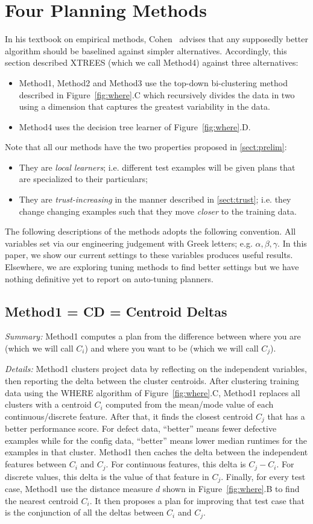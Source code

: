 \documentclass{sig-alternate}
\newcommand{\bi}{\begin{itemize}}
\newcommand{\ei}{\end{itemize}}
\newcommand{\tion}[1]{\textsection\ref{sect:#1}}
\newcommand{\fig}[1]{Figure~\ref{fig:#1}}
\begin{document}
\section{Four Planning Methods}
In his textbook on empirical methods, Cohen~\cite{cohen95} advises that any supposedly better
algorithm should be baselined against simpler alternatives. Accordingly,
this section described XTREES (which we call Method4) against three  
alternatives: 
  \bi
  \item  
  Method1, Method2 and Method3 use the   top-down
	bi-clustering method described in \fig{where}.C  which recursively divides the
	data in two  using a dimension that captures the greatest variability in the data. 
	\item
 Method4 uses the decision tree learner of \fig{where}.D. 
  \ei
  Note that all our methods have the two properties proposed in \tion{prelim}:
  \bi
  \item They are {\em local learners}; i.e. different test examples
  will be given plans that are specialized  to their particulars;
  \item They  are {\em trust-increasing} in the manner described in \tion{trust};
  i.e. they change changing examples such that they move {\em closer} to the training data.
  \ei
The following descriptions of the methods adopts the following convention. All variables
  set via  our engineering judgement  with Greek letters; e.g. $\alpha,\beta,\gamma$.
  In this paper, we show our current settings to these variables produces useful
  results. Elsewhere\cite{krall14,fu:ase15}, we are exploring tuning methods to 
  find better settings but  we have nothing definitive yet to report
  on auto-tuning planners.

\subsection{Method1 = CD =   Centroid Deltas}


 {\em Summary:} Method1  computes a plan from the difference between where you are  (which we will call $C_i$) and
where you want to be  (which we will call $C_j$).
 
 {\em Details:} Method1 clusters project data by reflecting   on the independent variables, then
  reporting the delta between the cluster centroids. 
  After clustering   training data using the WHERE algorithm of  \fig{where}.C, Method1
replaces all clusters with a  centroid $C_i$ computed from the mean/mode value of each
continuous/discrete feature. After that, it
finds the closest centroid $C_j$ that has a better
performance score. For defect data, ``better'' means fewer defective examples while for the config data,
``better'' means lower median runtimes for the examples in that cluster.
Method1 then caches the  delta between the independent features between $C_i$ and $C_j$. For continuous
features, this delta is $C_j - C_i$. For discrete values, this delta is the value of that feature
in $C_j$. 
Finally, for every test case, Method1 use the distance measure $d$ shown in \fig{where}.B to find
the nearest centroid $C_i$.  It then proposes a plan for improving that test case
that is the conjunction of all the deltas between $C_i$ and $C_j$.
\end{document}
